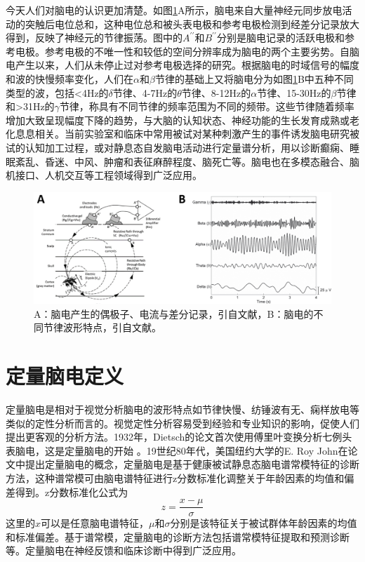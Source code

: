 今天人们对脑电的认识更加清楚。如图\ref{1:record}A所示，脑电来自大量神经元同步放电活动的突触后电位总和，这种电位总和被头表电极和参考电极检测到经差分记录放大得到，反映了神经元的节律振荡。图中的$A^{\prime\prime}$和$B^{\prime\prime}$分别是脑电记录的活跃电极和参考电极。参考电极的不唯一性和较低的空间分辨率成为脑电的两个主要劣势。自脑电产生以来，人们从未停止过对参考电极选择的研究。根据脑电的时域信号的幅度和波的快慢频率变化，人们在$\alpha$和$\beta$节律的基础上又将脑电分为如图\ref{1:record}B中五种不同类型的波，包括<4Hz的$\delta$节律、4-7Hz的$\theta$节律、8-12Hz的$\alpha$节律、15-30Hz的$\beta$节律和>31Hz的$\gamma$节律，称具有不同节律的频率范围为不同的频带。这些节律随着频率增加大致呈现幅度下降的趋势，与大脑的认知状态、神经功能的生长发育成熟或老化息息相关。当前实验室和临床中常用被试对某种刺激产生的事件诱发脑电研究被试的认知加工过程，或对静息态自发脑电活动进行定量谱分析，用以诊断癫痫、睡眠紊乱、昏迷、中风、肿瘤和表征麻醉程度、脑死亡等。脑电也在多模态融合、脑机接口、人机交互等工程领域得到广泛应用。
\begin{figure}[!h]
	\includegraphics[width=15cm]{pic/xulun/record.png}
	\caption{A：脑电产生的偶极子、电流与差分记录，引自文献，B：脑电的不同节律波形特点，引自文献。}
	\label{1:record}
\end{figure}


\section{定量脑电定义}
定量脑电是相对于视觉分析脑电的波形特点如节律快慢、纺锤波有无、痫样放电等类似的定性分析而言的。视觉定性分析容易受到经验和专业知识的影响，促使人们提出更客观的分析方法。1932年，Dietsch的论文\cite{Dietsch1932}首次使用傅里叶变换分析七例头表脑电，这是定量脑电的开始
。19世纪80年代，美国纽约大学的E. Roy John在论文\cite{john1977neurometrics,john1980developmental}中提出定量脑电的概念，定量脑电是基于健康被试静息态脑电谱常模特征的诊断方法，这种谱常模可由脑电谱特征进行z分数标准化调整关于年龄因素的均值和偏差得到。z分数标准化公式为
\begin{equation}
z=\frac{x-\mu}{\sigma}
\end{equation}
这里的$x$可以是任意脑电谱特征，$\mu$和$\sigma$分别是该特征关于被试群体年龄因素的均值和标准偏差。基于谱常模，定量脑电的诊断方法包括谱常模特征提取和预测诊断等。定量脑电在神经反馈和临床诊断中得到广泛应用。

